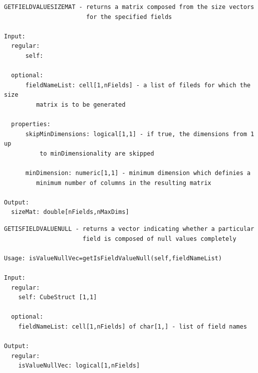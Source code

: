 \documentclass[letterpaper,10pt,english]{sphinxmanual}
\begin{document}
\label{chap_func:smartdb-relations-atypifiedstaticrelation-getfieldvaluesizemat}
\begin{Verbatim}[commandchars=\\\{\}]
GETFIELDVALUESIZEMAT - returns a matrix composed from the size vectors
                       for the specified fields

Input:
  regular:
      self:

  optional:
      fieldNameList: cell[1,nFields] - a list of fileds for which the size
         matrix is to be generated

  properties:
      skipMinDimensions: logical[1,1] - if true, the dimensions from 1 up
          to minDimensionality are skipped

      minDimension: numeric[1,1] - minimum dimension which definies a
         minimum number of columns in the resulting matrix

Output:
  sizeMat: double[nFields,nMaxDims]
\end{Verbatim}
\label{chap_func:smartdb-relations-atypifiedstaticrelation-getisfieldvaluenull}
\begin{Verbatim}[commandchars=\\\{\}]
GETISFIELDVALUENULL - returns a vector indicating whether a particular
                      field is composed of null values completely

Usage: isValueNullVec=getIsFieldValueNull(self,fieldNameList)

Input:
  regular:
    self: CubeStruct [1,1]

  optional:
    fieldNameList: cell[1,nFields] of char[1,] - list of field names

Output:
  regular:
    isValueNullVec: logical[1,nFields]
\end{Verbatim}
\end{document}
